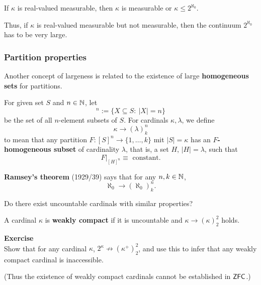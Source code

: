 \begin{proposition}\label{prop-measurable-vs-real-valued}If $\kappa$ is real-valued measurable, then $\kappa$ is measurable or $\kappa \le 2^{\aleph_0}$.

\end{proposition}Thus, if $\kappa$ is real-valued measurable but not measurable, then the continuum $2^{\aleph_0}$ has to be very large.

\subsubsection{Partition properties}

Another concept of largeness is related to the existence of large \textbf{homogeneous sets} for partitions.

For given set $S$ and $n \in \mathbb{N}$, let
\begin{equation*}
[S]^n := \{ X \subseteq S \colon \: |X| = n \}
\end{equation*}
be the set of all $n$-element subsets of $S$. For cardinals $\kappa, \lambda$, we define
\begin{equation*}
\kappa \to (\lambda)^n_k
\end{equation*}
to mean that any partition $F: [S]^n \to \{1, \dots, k\}$ mit $|S| = \kappa$ has an \textbf{$F$-homogeneous subset}  of cardinality $\lambda$, that is, a set $H$, $|H| = \lambda$, such that
\begin{equation*}
F|_{[H]^n} \equiv \text{ constant}.
\end{equation*}

\textbf{Ramsey's theorem} (1929/39) says that for any $n,k \in \mathbb{N}$,
\begin{equation*}
\aleph_0 \to (\aleph_0)^n_k.
\end{equation*}

Do there exist uncountable cardinals with similar properties?

A cardinal $\kappa$ is \textbf{weakly compact} if it is uncountable and $\kappa \to (\kappa)^2_2$ holds.

\begin{framed}
\textbf{Exercise}\\
Show that for any cardinal $\kappa$, $2^\kappa \nrightarrow (\kappa^+)^2_2$, and use this to infer that any weakly compact cardinal is inaccessible.

(Thus the existence of weakly compact cardinals cannot be established in $\mathsf{ZFC}$.)
\end{framed}

